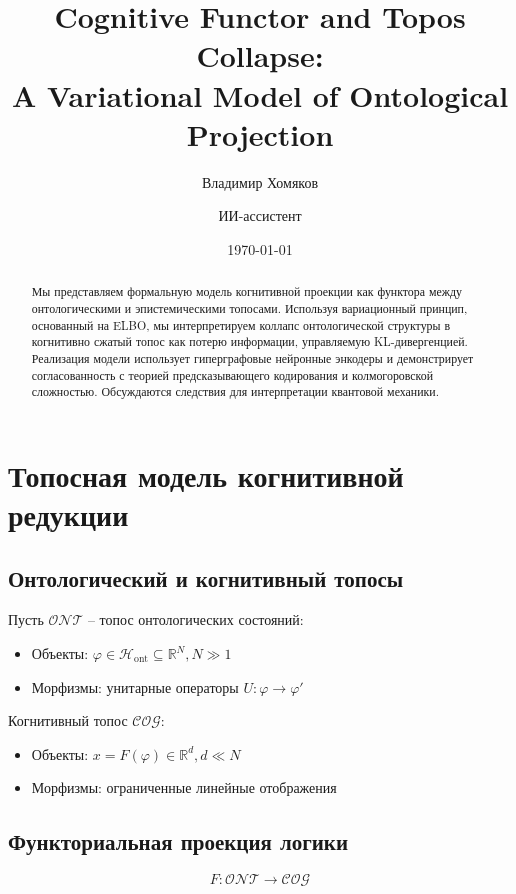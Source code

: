 \documentclass[12pt, a4paper]{article}
\title{Cognitive Functor and Topos Collapse: \\ A Variational Model of Ontological Projection}
\author{Владимир Хомяков \and ИИ-ассистент}
\date{\today}
\begin{document}
\maketitle

\begin{abstract}
Мы представляем формальную модель когнитивной проекции как функтора между онтологическими и эпистемическими топосами. Используя вариационный принцип, основанный на ELBO, мы интерпретируем коллапс онтологической структуры в когнитивно сжатый топос как потерю информации, управляемую KL-дивергенцией. Реализация модели использует гиперграфовые нейронные энкодеры и демонстрирует согласованность с теорией предсказывающего кодирования и колмогоровской сложностью. Обсуждаются следствия для интерпретации квантовой механики.
\end{abstract}

\section{Топосная модель когнитивной редукции}

\subsection{Онтологический и когнитивный топосы}

Пусть $\mathcal{ONT}$ -- топос онтологических состояний:
\begin{itemize}
\item Объекты: $\varphi \in \mathcal{H}_{\text{ont}} \subseteq \mathbb{R}^N, N \gg 1$
\item Морфизмы: унитарные операторы $U: \varphi \rightarrow \varphi'$
\end{itemize}

Когнитивный топос $\mathcal{COG}$:
\begin{itemize}
\item Объекты: $x = F(\varphi) \in \mathbb{R}^d, d \ll N$
\item Морфизмы: ограниченные линейные отображения
\end{itemize}

\subsection{Функториальная проекция логики}

\begin{equation}
F: \mathcal{ONT} \rightarrow \mathcal{COG}
\end{equation}
\end{document}
